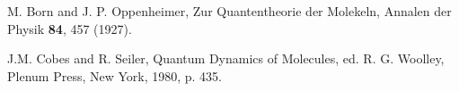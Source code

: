 \begin{thebibliography}{999}












 M. Born and J. P. Oppenheimer, 
Zur Quantentheorie der Molekeln,
Annalen der Physik 
{\bf 84}, 457 (1927).

 J.M. Cobes and R. Seiler, Quantum Dynamics of Molecules,
ed. R. G.  Woolley, Plenum Press, New York, 1980, p. 435.


\end{thebibliography}
